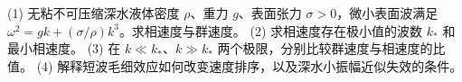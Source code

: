 (1) 无粘不可压缩深水液体密度 \(\rho\)、重力 \(g\)、表面张力 \(\sigma>0\)，微小表面波满足 \(\omega^2=gk+(\sigma/\rho)k^3\)。求相速度与群速度。
(2) 求相速度存在极小值的波数 \(k_*\) 和最小相速度。
(3) 在 \(k\ll k_*\)、\(k\gg k_*\) 两个极限，分别比较群速度与相速度的比值。
(4) 解释短波毛细效应如何改变速度排序，以及深水小振幅近似失效的条件。
